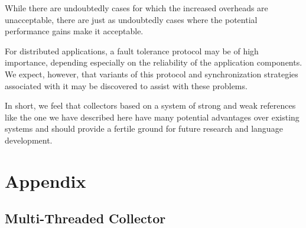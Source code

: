 While there are undoubtedly cases for which the increased overheads are unacceptable,
there are just as undoubtedly cases where the potential performance gains make it acceptable.

For distributed applications, a fault tolerance protocol may be of high importance, depending
especially on the reliability of the application components. We expect, however, that variants
of this protocol and synchronization strategies associated with it may be discovered to assist
with these problems.

In short, we feel that collectors based on a system of strong and weak references like
the one we have described here have many potential advantages over existing systems and
should provide a fertile ground for future research and language development.

\section{Appendix}
\subsection{Multi-Threaded Collector}
\label{singlethread}
%
\clearpage


